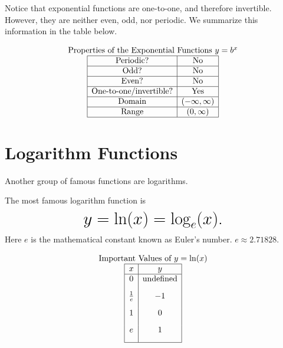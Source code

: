 \documentclass[nooutcomes]{ximera}
\begin{document}
Notice that exponential functions are one-to-one, and therefore invertible. However, they are neither even, odd, nor periodic. We summarize this information in the table below.

\[
\begin{array}{c}
 \text{\normalfont Properties of the Exponential Functions } y=b^x \\
\begin{array}{|c|c|}
\hline
\text{Periodic?} & \text{No} \\ \hline
\text{Odd?} & \text{No} \\ \hline
\text{Even?} & \text{No} \\ \hline
\text{One-to-one/invertible?} & \text{Yes} \\ \hline
\text{Domain} & (-\infty,\infty)\\ \hline
\text{Range} & (0,\infty)\\ \hline
\end{array}
\end{array}
 \]



\newpage


\section{Logarithm Functions}
Another group of famous functions are logarithms.

\begin{example}
The most famous logarithm function is
 $$ \mbox{\huge $y=\ln(x)=\log_{e}(x)$.}$$ 
Here $e$ is the mathematical constant known as Euler's number. $e \approx 2.71828$.

\begin{center}
\end{center}


\[
\begin{array}{ c  }
  \text{Important Values of $y=\ln(x)$}\\
 \begin{array}{|c|c|}
 \hline
 x & y\\
 \hline
0&\text{undefined}\\[2ex]
\frac{1}{e}&-1\\[2ex]
1&0\\[2ex]
e&1\\[2ex]
 \hline
 \end{array}
\end{array}
 \]

\end{example}
\end{document}
